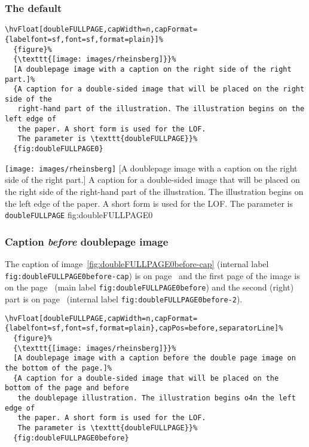 \documentclass[twoside]{scrartcl}
\makeatletter
\let\hvBlindtext\Blindtext
\def\Blindtext{\par\color{black!40}\hvBlindtext\par\normalcolor}
\def\hvblindtext{\textcolor{black!40}{\blindtext@text}}
\makeatother
\begin{document}
\hvblindtext

\subsubsection{The default}

\begin{lstlisting}
\hvFloat[doubleFULLPAGE,capWidth=n,capFormat={labelfont=sf,font=sf,format=plain}]%
  {figure}%
  {\texttt{[image: images/rheinsberg]}}%
  [A doublepage image with a caption on the right side of the right part.]%
  {A caption for a double-sided image that will be placed on the right side of the
   right-hand part of the illustration. The illustration begins on the left edge of 
   the paper. A short form is used for the LOF. 
   The parameter is \texttt{doubleFULLPAGE}}%
  {fig:doubleFULLPAGE0}
\end{lstlisting}


%
  {\texttt{[image: images/rheinsberg]}}%
  [A doublepage image with a caption on the right side of the right part.]%
  {A caption for a double-sided image that will be placed on the right side of the
   right-hand part of the illustration. The illustration begins on the left edge of 
   the paper. A short form is used for the LOF. 
   The parameter is \texttt{doubleFULLPAGE}}%
  {fig:doubleFULLPAGE0}

\Blindtext

\Blindtext


\subsubsection{Caption \emph{before} doublepage image}
The caption of image~\ref{fig:doubleFULLPAGE0before-cap} (internal label \texttt{fig:doubleFULLPAGE0before-cap}) is on 
page~\pageref{fig:doubleFULLPAGE0before-cap} and the first page of the image 
is on the page~\pageref{fig:doubleFULLPAGE0before} (main label \texttt{fig:doubleFULLPAGE0before}) and the
second (right) part  is on page~\pageref{fig:doubleFULLPAGE0before-2} (internal label \texttt{fig:doubleFULLPAGE0before-2}).

\begin{lstlisting}
\hvFloat[doubleFULLPAGE,capWidth=n,capFormat={labelfont=sf,font=sf,format=plain},capPos=before,separatorLine]%
  {figure}%
  {\texttt{[image: images/rheinsberg]}}%
  [A doublepage image with a caption before the double page image on the bottom of the page.]%
  {A caption for a double-sided image that will be placed on the bottom of the page and before
   the doublepage illustration. The illustration begins o4n the left edge of 
   the paper. A short form is used for the LOF. 
   The parameter is \texttt{doubleFULLPAGE}}%
  {fig:doubleFULLPAGE0before}
\end{lstlisting}
\end{document}
